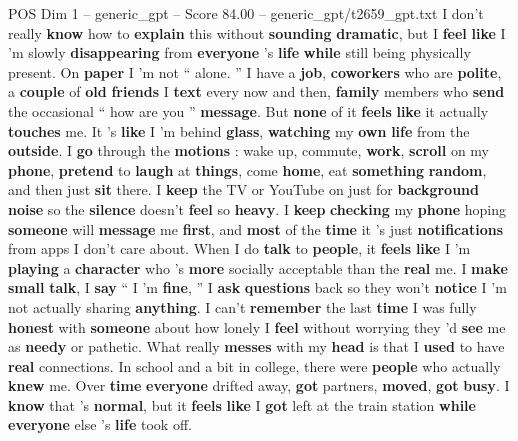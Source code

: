 \begin{textsample}{POS Dim 1 – generic\_gpt – Score 84.00 – generic\_gpt/t2659\_gpt.txt}  \label{ex:f1_pos_003}
I don't really \textbf{know} how to \textbf{explain} this without \textbf{sounding} \textbf{dramatic}, but I \textbf{feel} \textbf{like} I ’m slowly \textbf{disappearing} from \textbf{everyone} ’s \textbf{life} \textbf{while} still being physically present.
On \textbf{paper} I ’m not “ alone. ” I have a \textbf{job}, \textbf{coworkers} who are \textbf{polite}, a \textbf{couple} of \textbf{old} \textbf{friends} I \textbf{text} every now and then, \textbf{family} members who \textbf{send} the occasional “ how are you ” \textbf{message}.
But \textbf{none} of it \textbf{feels} \textbf{like} it actually \textbf{touches} me.
It ’s \textbf{like} I ’m behind \textbf{glass}, \textbf{watching} my \textbf{own} \textbf{life} from the \textbf{outside}.
I \textbf{go} through the \textbf{motions} : wake up, commute, \textbf{work}, \textbf{scroll} on my \textbf{phone}, \textbf{pretend} to \textbf{laugh} at \textbf{things}, come \textbf{home}, eat \textbf{something} \textbf{random}, and then just \textbf{sit} there.
I \textbf{keep} the TV or YouTube on just for \textbf{background} \textbf{noise} so the \textbf{silence} doesn't \textbf{feel} so \textbf{heavy}.
I \textbf{keep} \textbf{checking} my \textbf{phone} hoping \textbf{someone} will \textbf{message} me \textbf{first}, and \textbf{most} of the \textbf{time} it ’s just \textbf{notifications} from apps I don't care about.
When I do \textbf{talk} to \textbf{people}, it \textbf{feels} \textbf{like} I ’m \textbf{playing} a \textbf{character} who ’s \textbf{more} socially acceptable than the \textbf{real} me.
I \textbf{make} \textbf{small} \textbf{talk}, I \textbf{say} “ I ’m \textbf{fine}, ” I \textbf{ask} \textbf{questions} back so they won't \textbf{notice} I ’m not actually sharing \textbf{anything}.
I can't \textbf{remember} the last \textbf{time} I was fully \textbf{honest} with \textbf{someone} about how lonely I \textbf{feel} without worrying they ’d \textbf{see} me as \textbf{needy} or pathetic.
What really \textbf{messes} with my \textbf{head} is that I \textbf{used} to have \textbf{real} connections.
In school and a bit in college, there were \textbf{people} who actually \textbf{knew} me.
Over \textbf{time} \textbf{everyone} drifted away, \textbf{got} partners, \textbf{moved}, \textbf{got} \textbf{busy}.
I \textbf{know} that ’s \textbf{normal}, but it \textbf{feels} \textbf{like} I \textbf{got} left at the train station \textbf{while} \textbf{everyone} else ’s \textbf{life} took off.

\end{textsample}
